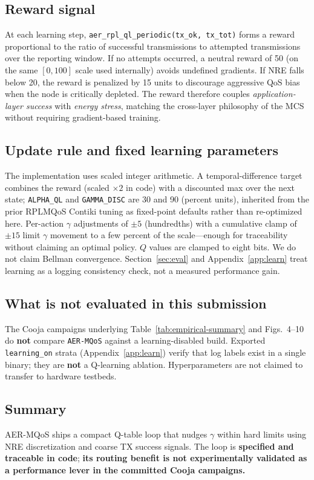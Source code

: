 \subsection{Reward signal}
At each learning step, \texttt{aer\_rpl\_ql\_periodic(tx\_ok, tx\_tot)} forms a reward proportional to the ratio of successful transmissions to attempted transmissions over the reporting window. If no attempts occurred, a neutral reward of 50 (on the same $[0,100]$ scale used internally) avoids undefined gradients. If NRE falls below 20, the reward is penalized by 15 units to discourage aggressive QoS bias when the node is critically depleted. The reward therefore couples \emph{application-layer success} with \emph{energy stress}, matching the cross-layer philosophy of the MCS without requiring gradient-based training.

\subsection{Update rule and fixed learning parameters}
\begingroup\sloppy
The implementation uses scaled integer arithmetic. A temporal-difference target combines the reward (scaled $\times 2$ in code) with a discounted max over the next state; \texttt{ALPHA\_QL} and \texttt{GAMMA\_DISC} are 30 and 90 (percent units), inherited from the prior RPLMQoS Contiki tuning as fixed-point defaults rather than re-optimized here. Per-action $\gamma$ adjustments of $\pm 5$ (hundredths) with a cumulative clamp of $\pm 15$ limit $\gamma$ movement to a few percent of the scale---enough for traceability without claiming an optimal policy. $Q$ values are clamped to eight bits. We do not claim Bellman convergence. Section~\ref{sec:eval} and Appendix~\ref{app:learn} treat learning as a logging consistency check, not a measured performance gain.
\endgroup

\subsection{What is not evaluated in this submission}
The Cooja campaigns underlying Table~\ref{tab:empirical-summary} and Figs.~4--10 do \textbf{not} compare \texttt{AER-MQoS} against a learning-disabled build. Exported \texttt{learning\_on} strata (Appendix~\ref{app:learn}) verify that log labels exist in a single binary; they are \textbf{not} a Q-learning ablation. Hyperparameters are not claimed to transfer to hardware testbeds.

\subsection{Summary}
AER-MQoS ships a compact Q-table loop that nudges $\gamma$ within hard limits using NRE discretization and coarse TX success signals. The loop is \textbf{specified and traceable in code}; \textbf{its routing benefit is not experimentally validated as a performance lever in the committed Cooja campaigns.}
